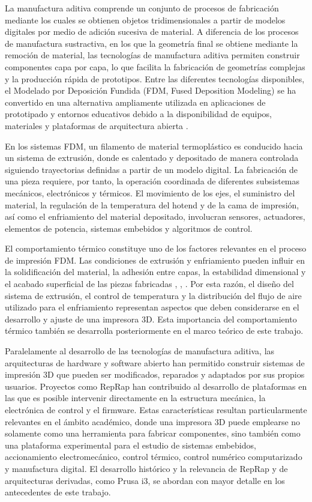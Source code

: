 La manufactura aditiva comprende un conjunto de procesos de fabricación mediante los cuales se obtienen objetos tridimensionales a partir de modelos digitales por medio de adición sucesiva de material. A diferencia de los procesos de manufactura sustractiva, en los que la geometría final se obtiene mediante la remoción de material, las tecnologías de manufactura aditiva permiten construir componentes capa por capa, lo que facilita la fabricación de geometrías complejas y la producción rápida de prototipos. Entre las diferentes tecnologías disponibles, el Modelado por Deposición Fundida (FDM, Fused Deposition Modeling) se ha convertido en una alternativa ampliamente utilizada en aplicaciones de prototipado y entornos educativos debido a la disponibilidad de equipos, materiales y plataformas de arquitectura abierta \cite{iso_52900_2021}.

En los sistemas FDM, un filamento de material termoplástico es conducido hacia un sistema de extrusión, donde es calentado y depositado de manera controlada siguiendo trayectorias definidas a partir de un modelo digital. La fabricación de una pieza requiere, por tanto, la operación coordinada de diferentes subsistemas mecánicos, electrónicos y térmicos. El movimiento de los ejes, el suministro del material, la regulación de la temperatura del hotend y de la cama de impresión, así como el enfriamiento del material depositado, involucran sensores, actuadores, elementos de potencia, sistemas embebidos y algoritmos de control.

El comportamiento térmico constituye uno de los factores relevantes en el proceso de impresión FDM. Las condiciones de extrusión y enfriamiento pueden influir en la solidificación del material, la adhesión entre capas, la estabilidad dimensional y el acabado superficial de las piezas fabricadas \cite{iso_52900_2021}, \cite{callister2020}, \cite{chanda2006}. Por esta razón, el diseño del sistema de extrusión, el control de temperatura y la distribución del flujo de aire utilizado para el enfriamiento representan aspectos que deben considerarse en el desarrollo y ajuste de una impresora 3D. Esta importancia del comportamiento térmico también se desarrolla posteriormente en el marco teórico de este trabajo.

Paralelamente al desarrollo de las tecnologías de manufactura aditiva, las arquitecturas de hardware y software abierto han permitido construir sistemas de impresión 3D que pueden ser modificados, reparados y adaptados por sus propios usuarios. Proyectos como RepRap han contribuido al desarrollo de plataformas en las que es posible intervenir directamente en la estructura mecánica, la electrónica de control y el firmware. Estas características resultan particularmente relevantes en el ámbito académico, donde una impresora 3D puede emplearse no solamente como una herramienta para fabricar componentes, sino también como una plataforma experimental para el estudio de sistemas embebidos, accionamiento electromecánico, control térmico, control numérico computarizado y manufactura digital. El desarrollo histórico y la relevancia de RepRap y de arquitecturas derivadas, como Prusa i3, se abordan con mayor detalle en los antecedentes de este trabajo. 

